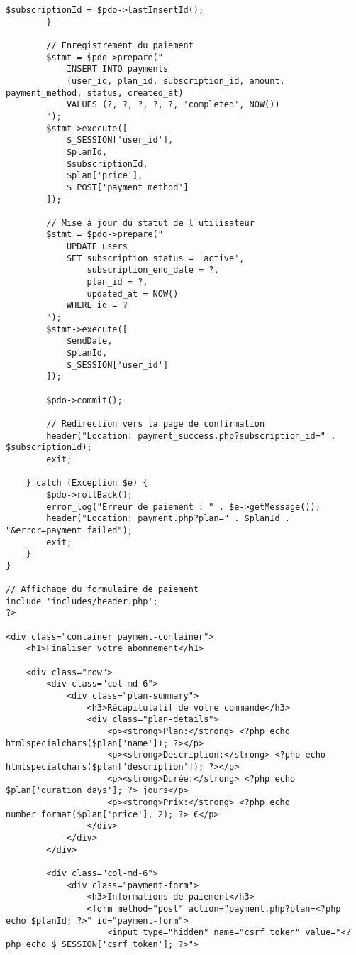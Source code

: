 \documentclass[12pt,a4paper]{report}
\begin{document}
\begin{lstlisting}[style=phpStyle, caption=Extrait de payment.php - Traitement des paiements]
            $subscriptionId = $pdo->lastInsertId();
        }
        
        // Enregistrement du paiement
        $stmt = $pdo->prepare("
            INSERT INTO payments 
            (user_id, plan_id, subscription_id, amount, payment_method, status, created_at)
            VALUES (?, ?, ?, ?, ?, 'completed', NOW())
        ");
        $stmt->execute([
            $_SESSION['user_id'],
            $planId,
            $subscriptionId,
            $plan['price'],
            $_POST['payment_method']
        ]);
        
        // Mise à jour du statut de l'utilisateur
        $stmt = $pdo->prepare("
            UPDATE users 
            SET subscription_status = 'active',
                subscription_end_date = ?,
                plan_id = ?,
                updated_at = NOW()
            WHERE id = ?
        ");
        $stmt->execute([
            $endDate,
            $planId,
            $_SESSION['user_id']
        ]);
        
        $pdo->commit();
        
        // Redirection vers la page de confirmation
        header("Location: payment_success.php?subscription_id=" . $subscriptionId);
        exit;
        
    } catch (Exception $e) {
        $pdo->rollBack();
        error_log("Erreur de paiement : " . $e->getMessage());
        header("Location: payment.php?plan=" . $planId . "&error=payment_failed");
        exit;
    }
}

// Affichage du formulaire de paiement
include 'includes/header.php';
?>

<div class="container payment-container">
    <h1>Finaliser votre abonnement</h1>
    
    <div class="row">
        <div class="col-md-6">
            <div class="plan-summary">
                <h3>Récapitulatif de votre commande</h3>
                <div class="plan-details">
                    <p><strong>Plan:</strong> <?php echo htmlspecialchars($plan['name']); ?></p>
                    <p><strong>Description:</strong> <?php echo htmlspecialchars($plan['description']); ?></p>
                    <p><strong>Durée:</strong> <?php echo $plan['duration_days']; ?> jours</p>
                    <p><strong>Prix:</strong> <?php echo number_format($plan['price'], 2); ?> €</p>
                </div>
            </div>
        </div>
        
        <div class="col-md-6">
            <div class="payment-form">
                <h3>Informations de paiement</h3>
                <form method="post" action="payment.php?plan=<?php echo $planId; ?>" id="payment-form">
                    <input type="hidden" name="csrf_token" value="<?php echo $_SESSION['csrf_token']; ?>">
                    

\end{lstlisting}
\end{document}
